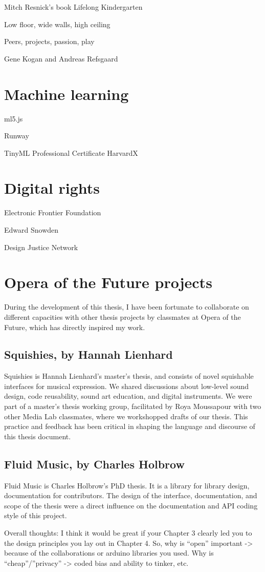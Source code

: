 Mitch Resnick's book Lifelong Kindergarten

Low floor, wide walls, high ceiling

Peers, projects, passion, play

Gene Kogan and Andreas Refsgaard

\section{Machine learning}

ml5.js

Runway

TinyML Professional Certificate HarvardX

\section{Digital rights}

Electronic Frontier Foundation

Edward Snowden

Design Justice Network

\section{Opera of the Future projects}

During the development of this thesis, I have been fortunate to collaborate on different capacities with other thesis projects by classmates at Opera of the Future, which has directly inspired my work.

\subsection{Squishies, by Hannah Lienhard}

Squishies is Hannah Lienhard's master's thesis, and consists of novel squishable interfaces for musical expression. We shared discussions about low-level sound design, code reusability, sound art education, and digital instruments. We were part of a master's thesis working group, facilitated by Roya Moussapour with two other Media Lab classmates, where we workshopped drafts of our thesis. This practice and feedback has been critical in shaping the language and discourse of this thesis document.

\subsection{Fluid Music, by Charles Holbrow}

Fluid Music is Charles Holbrow's PhD thesis. It is a library for library design, documentation for contributors. The design of the interface, documentation, and scope of the thesis were a direct influence on the documentation and API coding style of this project.

Overall thoughts: I think it would be great if your Chapter 3 clearly led you to the design principles you lay out in Chapter 4. So, why is “open” important -> because of the collaborations or arduino libraries you used. Why is “cheap”/”privacy” -> coded bias and ability to tinker, etc.
